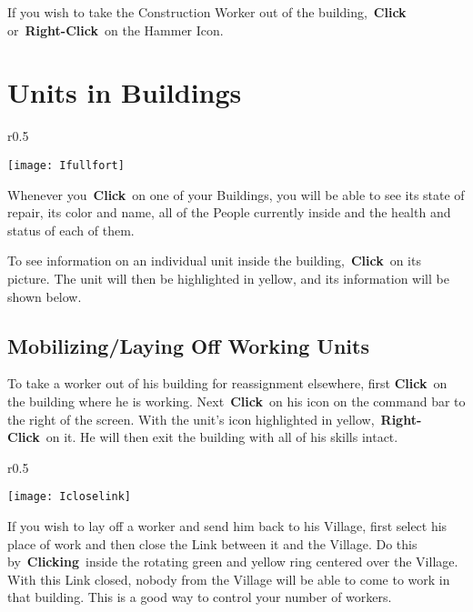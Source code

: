 If you wish to take the Construction Worker out of the building, \textbf{Click} or \textbf{Right-Click} on the Hammer Icon.

\section{Units in Buildings}


\begin{wrapfigure}{r}{0.5\textwidth}
	\vspace{-20pt}
	\begin{center}
		\texttt{[image: Ifullfort]}
	\end{center}
	\vspace{-5pt}
\end{wrapfigure}

Whenever you \textbf{Click} on one of your Buildings, you will be able to see its state of repair, its color and name, all of the People currently inside and the health and status of each of them.

To see information on an individual unit inside the building, \textbf{Click} on its picture. The unit will then be highlighted in yellow, and its information will be shown below.

\subsection{Mobilizing/Laying Off Working Units}

To take a worker out of his building for reassignment elsewhere, first \textbf{Click} on the building where he is working. Next \textbf{Click} on his icon on the command bar to the right of the screen. With the unit’s icon highlighted in yellow, \textbf{Right-Click} on it. He will then exit the building with all of his skills intact.

\begin{wrapfigure}{r}{0.5\textwidth}
	\vspace{-20pt}
	\begin{center}
		\texttt{[image: Icloselink]}
	\end{center}
	\vspace{-20pt}
\end{wrapfigure}

If you wish to lay off a worker and send him back to his Village, first select his place of work and then close the Link between it and the Village. Do this by \textbf{Clicking} inside the rotating green and yellow ring centered over the Village. With this Link closed, nobody from the Village will be able to come to work in that building. This is a good way to control your number of workers.

